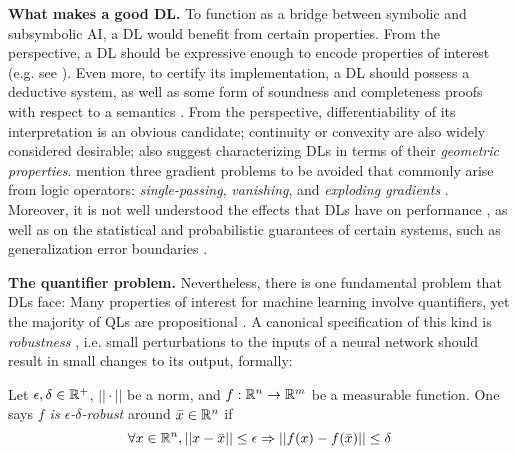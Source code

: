 \textbf{What makes a good DL.} To function as a bridge between symbolic and subsymbolic AI, a DL would benefit from certain properties. From the \SiAI{} perspective, a DL should be expressive enough to encode properties of interest (e.g. see \citep{daggitt2024vehicle}). Even more, to certify its implementation, a DL should possess a deductive system, as well as some form of soundness and completeness proofs with respect to a semantics \citep{floyd1993assigning, goguen1977initial}. From the \SuAI{} perspective, differentiability of its interpretation is an obvious candidate; continuity or convexity are also widely considered desirable; \citeauthor{varnai2020robustness} also suggest characterizing DLs in terms of their \textit{geometric properties}. %
\citeauthor{van2022analyzing} mention three gradient problems to be avoided that commonly arise from logic operators: \emph{single-passing}, \emph{vanishing}, and \emph{exploding gradients} \citep{van2022analyzing}. Moreover, it is not well understood the effects that DLs have on performance \citep{flinkow2025generalised}, as well as on the statistical and probabilistic guarantees of certain systems, such as generalization error boundaries \citep{jakubovitz2019generalization}.


\textbf{The quantifier problem.} Nevertheless, there is one fundamental problem that DLs face: Many properties of interest for machine learning involve quantifiers, yet the majority of QLs are propositional \citep{bacci2024polynomial, bacci2023propositional, bacci2025induction}. A canonical specification of this kind is  \textit{robustness} \citep{casadio2022neural},  i.e. small perturbations to the inputs of a neural network should result in small changes to its output, formally:
\begin{definition} %
\label{Robustness}%
    Let $\epsilon, \delta \in \mathbb{R}^+$, $||\cdot||$ be a norm, and $f : \mathbb{R}^n \rightarrow \mathbb{R}^m$ be a measurable function.
    One says \textit{$f$ is $\epsilon$-$\delta$-robust} around $\bar x \in \mathbb{R} ^ n$ if 
    \begin{equation}
    \label{eq:robustness}
        \forall x\in \mathbb{R}^n , ||x - \bar x|| \leq \epsilon \Rightarrow || 
			f(x) - f(\bar x)|| \leq \delta  
    \end{equation}
\end{definition}

